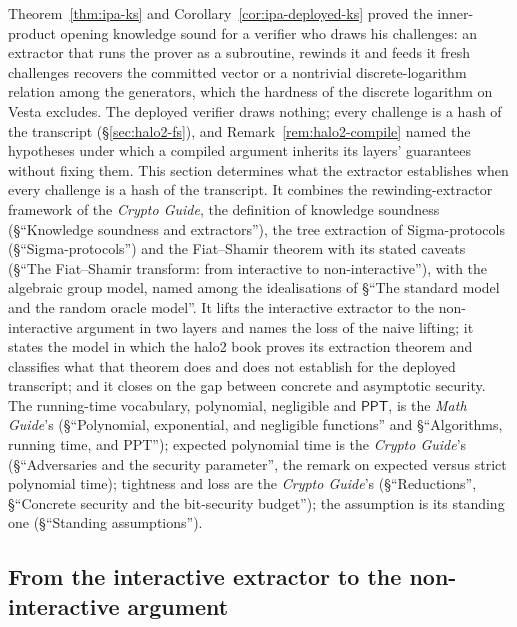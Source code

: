\documentclass[11pt,a4paper]{article}
\theoremstyle{definition}
\newcommand{\PPT}{\mathsf{PPT}}
\begin{document}
Theorem~\ref{thm:ipa-ks} and Corollary~\ref{cor:ipa-deployed-ks} proved
the inner-product opening knowledge sound for a verifier who draws his
challenges: an extractor that runs the prover
as a subroutine, rewinds it and feeds it fresh challenges recovers the
committed vector or a nontrivial discrete-logarithm relation among the
generators, which the hardness of the discrete logarithm on Vesta
excludes. The deployed verifier draws nothing; every challenge is a hash
of the transcript (\S\ref{sec:halo2-fs}), and
Remark~\ref{rem:halo2-compile} named the hypotheses under which a
compiled argument inherits its layers' guarantees without fixing them.
This section determines what the extractor establishes when every
challenge is a hash of the transcript. It combines the
rewinding-extractor framework of the \emph{Crypto Guide}, the
definition of knowledge soundness (\S``Knowledge soundness and
extractors''), the tree extraction of Sigma-protocols
(\S``Sigma-protocols'') and the Fiat--Shamir theorem with its stated
caveats (\S``The Fiat--Shamir transform: from interactive to
non-interactive''), with the algebraic group model, named among the
idealisations of \S``The standard model and the random oracle model''.
It lifts the interactive extractor to the non-interactive argument in two
layers and names the loss of the naive lifting; it states the model in
which the halo2 book proves its extraction theorem and classifies what
that theorem does and does not establish for the deployed transcript;
and it closes on the gap between concrete and asymptotic security. The
running-time vocabulary, polynomial, negligible and $\PPT$, is the
\emph{Math Guide}'s (\S``Polynomial, exponential, and negligible
functions'' and \S``Algorithms, running time, and PPT''); expected
polynomial time is the \emph{Crypto Guide}'s (\S``Adversaries and the
security parameter'', the remark on expected versus strict polynomial
time); tightness and loss are the \emph{Crypto Guide}'s
(\S``Reductions'', \S``Concrete security and the bit-security budget'');
the assumption is its standing one (\S``Standing assumptions'').

\subsection{From the interactive extractor to the non-interactive
  argument}
\label{sec:ks-noninteractive}
\end{document}
